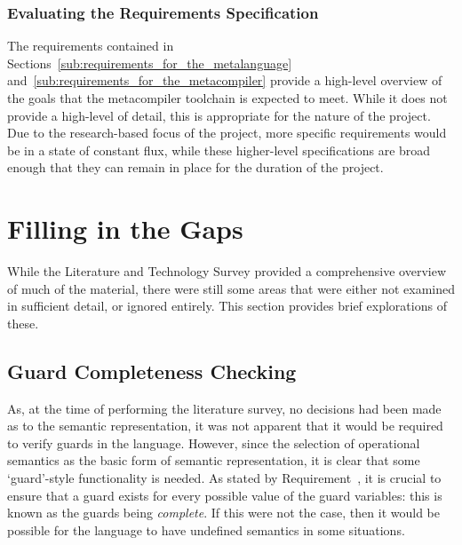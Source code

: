 
\subsubsection{Evaluating the Requirements Specification} %
\label{ssub:evaluating_the_requirements_specification}
The requirements contained in Sections~\ref{sub:requirements_for_the_metalanguage} and~\ref{sub:requirements_for_the_metacompiler} provide a high-level overview of the goals that the metacompiler toolchain is expected to meet. 
While it does not provide a high-level of detail, this is appropriate for the nature of the project.\\

Due to the research-based focus of the project, more specific requirements would be in a state of constant flux, while these higher-level specifications are broad enough that they can remain in place for the duration of the project.



\section{Filling in the Gaps} %
\label{sec:filling_in_the_gaps}
While the Literature and Technology Survey provided a comprehensive overview of much of the material, there were still some areas that were either not examined in sufficient detail, or ignored entirely. 
This section provides brief explorations of these.

\subsection{Guard Completeness Checking} %
\label{sub:guard_completeness_checking}
As, at the time of performing the literature survey, no decisions had been made as to the semantic representation, it was not apparent that it would be required to verify guards in the language.
However, since the selection of operational semantics as the basic form of semantic representation, it is clear that some `guard'-style functionality is needed.
As stated by Requirement~, it is crucial to ensure that a guard exists for every possible value of the guard variables: this is known as the guards being \textit{complete}. 
If this were not the case, then it would be possible for the language to have undefined semantics in some situations.\\

